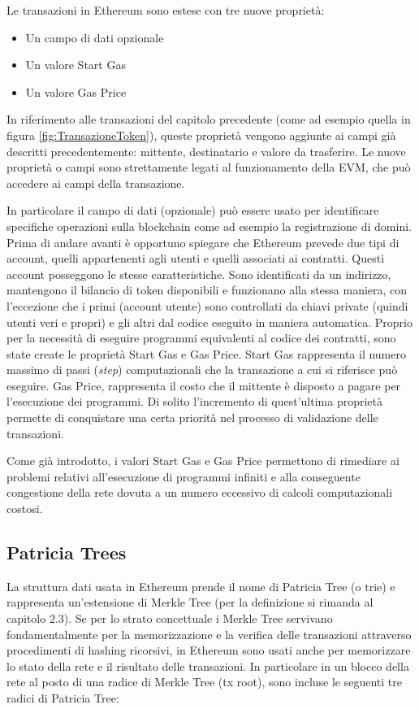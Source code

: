 Le transazioni in Ethereum sono estese con tre nuove proprietà:

\begin{itemize}
\item Un campo di dati opzionale
\item Un valore Start Gas
\item Un valore Gas Price
\end{itemize}

In riferimento alle transazioni del capitolo precedente (come ad esempio quella in figura \ref{fig:TransazioneToken}), queste proprietà vengono aggiunte ai campi già descritti precedentemente: mittente, destinatario e valore da trasferire. Le nuove proprietà o campi sono strettamente legati al funzionamento della EVM, che può accedere ai campi della transazione.

In particolare il campo di dati (opzionale) può essere usato per identificare specifiche operazioni sulla blockchain come ad esempio la registrazione di domini. Prima di andare avanti è opportuno spiegare che Ethereum prevede due tipi di account, quelli appartenenti agli utenti e quelli associati ai contratti. Questi account posseggono le stesse caratteristiche. Sono identificati da un indirizzo, mantengono il bilancio di token disponibili e funzionano alla stessa maniera, con l’eccezione che i primi (account utente) sono controllati da chiavi private (quindi utenti veri e propri) e gli altri dal codice eseguito in maniera automatica. Proprio per la necessità di eseguire programmi equivalenti al codice dei contratti, sono state create le proprietà Start Gas e Gas Price. Start Gas rappresenta il numero massimo di passi (\emph{step}) computazionali che la transazione a cui si riferisce può eseguire. Gas Price, rappresenta il costo che il mittente è disposto a pagare per l’esecuzione dei programmi. Di solito l’incremento di quest’ultima proprietà permette di conquistare una certa priorità nel processo di validazione delle transazioni.

Come già introdotto, i valori Start Gas e Gas Price permettono di rimediare ai problemi relativi all'esecuzione di programmi infiniti e alla conseguente congestione della rete dovuta a un numero eccessivo di calcoli computazionali costosi.

\subsection{Patricia Trees}
La struttura dati usata in Ethereum prende il nome di Patricia Tree (o trie) e rappresenta un’estensione di Merkle Tree (per la definizione si rimanda al capitolo 2.3). Se per lo strato concettuale i Merkle Tree servivano fondamentalmente per la memorizzazione e la verifica delle transazioni attraverso procedimenti di hashing ricorsivi, in Ethereum sono usati anche per memorizzare lo stato della rete e il risultato delle transazioni. In particolare in un blocco della rete al posto di una radice di Merkle Tree (tx root), sono incluse le seguenti tre radici di Patricia Tree:


